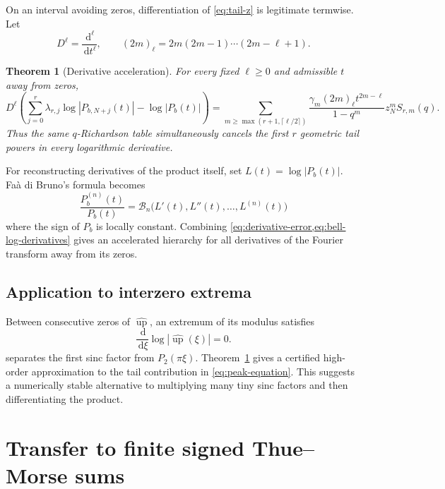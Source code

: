 \documentclass[11pt]{article}
\newtheorem{theorem}{Theorem}[section]
\theoremstyle{definition}
\theoremstyle{remark}
\newcommand{\Up}{\operatorname{up}}
\newcommand{\dd}{\,\mathrm{d}}
\begin{document}
On an interval avoiding zeros, differentiation of \cref{eq:tail-z} is legitimate termwise. Let
\[
D^\ell=\frac{\dd^\ell}{\dd t^\ell},\qquad
(2m)_{\ell}=2m(2m-1)\cdots(2m-\ell+1).
\]

\begin{theorem}[Derivative acceleration]
\label{thm:derivative-accel}
For every fixed $\ell\ge0$ and admissible $t$ away from zeros,
\begin{equation}
D^\ell\!\left(
\sum_{j=0}^{r}\lambda_{r,j}\log|P_{b,N+j}(t)|
-\log|P_b(t)|\right)
=
\sum_{m\ge\max(r+1,\lceil\ell/2\rceil)}
\frac{\gamma_m(2m)_\ell t^{2m-\ell}}
{1-q^m}z_N^mS_{r,m}(q).
\label{eq:derivative-error}
\end{equation}
Thus the same $q$-Richardson table simultaneously cancels the first $r$ geometric tail powers in every logarithmic derivative.
\end{theorem}

For reconstructing derivatives of the product itself, set $L(t)=\log|P_b(t)|$. Fa\`a di Bruno's formula becomes
\begin{equation}
\frac{P_b^{(n)}(t)}{P_b(t)}
=\mathcal B_n\bigl(L'(t),L''(t),\ldots,L^{(n)}(t)\bigr)
\label{eq:bell-log-derivatives}
\end{equation}
where the sign of $P_b$ is locally constant. Combining \cref{eq:derivative-error,eq:bell-log-derivatives} gives an accelerated hierarchy for all derivatives of the Fourier transform away from its zeros.

\subsection{Application to interzero extrema}

Between consecutive zeros of $\widehat{\Up}$, an extremum of its modulus satisfies
\begin{equation}
\frac{\dd}{\dd\xi}\log|\widehat{\Up}(\xi)|=0.
\label{eq:peak-equation}
\end{equation}
 separates the first sinc factor from $P_2(\pi\xi)$. Theorem~\ref{thm:derivative-accel} gives a certified high-order approximation to the tail contribution in \cref{eq:peak-equation}. This suggests a numerically stable alternative to multiplying many tiny sinc factors and then differentiating the product.

\section{Transfer to finite signed Thue--Morse sums}
\label{sec:thue-morse-transfer}
\end{document}
